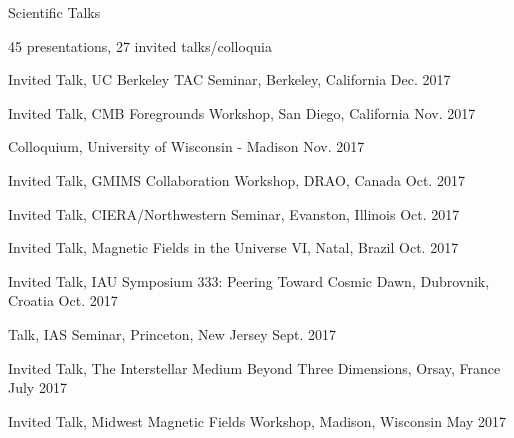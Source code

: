 \documentclass{resume_clark} %
\begin{document}
\begin{rSection}{Scientific Talks}

45 presentations, 27 invited talks/colloquia 

\begin{etaremune}[itemsep=-1.8mm]



\item Invited Talk, UC Berkeley TAC Seminar, Berkeley, California \hfill{Dec. 2017}

\item Invited Talk, CMB Foregrounds Workshop, San Diego, California \hfill{Nov. 2017}

\item Colloquium, University of Wisconsin - Madison \hfill{Nov. 2017}

\item Invited Talk, GMIMS Collaboration Workshop, DRAO, Canada \hfill{Oct. 2017}

\item Invited Talk, CIERA/Northwestern Seminar, Evanston, Illinois \hfill{Oct. 2017}

\item Invited Talk, Magnetic Fields in the Universe VI, Natal, Brazil \hfill{Oct. 2017}

\item Invited Talk, IAU Symposium 333: Peering Toward Cosmic Dawn, Dubrovnik, Croatia \hfill{Oct. 2017}

\item Talk, IAS Seminar, Princeton, New Jersey \hfill{Sept. 2017}

\item Invited Talk, The Interstellar Medium Beyond Three Dimensions, Orsay, France \hfill{July 2017}

\item Invited Talk, Midwest Magnetic Fields Workshop, Madison, Wisconsin \hfill{May 2017}


\end{etaremune}
\end{rSection}
\end{document}
